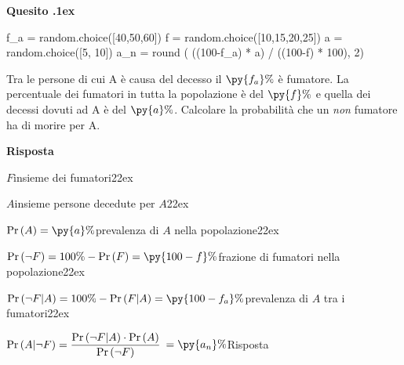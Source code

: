 \documentclass[11pt,twoside,a4paper]{article}
\def\Pr{{\rm Pr\,}}
\newcounter{quesito}
\newenvironment{question}{\bigskip\addtocounter{quesito}{1}\par\textbf{Quesito \thequesito.\kern1ex}}{\vspace{\parskip}}
\newenvironment{answer}{\par\textbf{Risposta\quad}}{\vspace{\parskip}}
\begin{document}
\begin{question}
\def\Pr{{\rm Pr\,}}
\begin{pycode}
f_a = random.choice([40,50,60])
f = random.choice([10,15,20,25])
a = random.choice([5, 10])
a_n = round ( ((100-f_a) * a) / ((100-f) * 100), 2)
\end{pycode}
Tra le persone di cui A è causa del decesso il $\py{f_a}\%$ è fumatore.  La percentuale dei fumatori in tutta la popolazione è del $\py{f}\%$ e quella dei decessi dovuti ad A è del $\py{a}\%$. Calcolare la probabilità che un \textit{non\/} fumatore ha di morire per A.
\begin{answer}

$F$\hfill insieme dei fumatori\kern22ex

$A$\hfill insieme persone decedute per $A$\kern22ex

$\Pr(A)=\py{a}\%$\hfill prevalenza di $A$ nella popolazione\kern22ex

$\Pr(\neg F)=100\% - \Pr(F) =\py{100-f}\%$\hfill frazione di fumatori nella popolazione\kern22ex

$\Pr(\neg F|A)=100\%-\Pr(F|A)  =\py{100-f_a}\%$\hfill prevalenza di $A$ tra i fumatori\kern22ex

$\Pr(A|\neg F)=\dfrac{\Pr(\neg F|A)\cdot \Pr(A)}{\Pr(\neg F)}$  {\color{blue}$=\py{a_n}\%$\hfill Risposta}

\end{answer}
\end{question}
\end{document}
